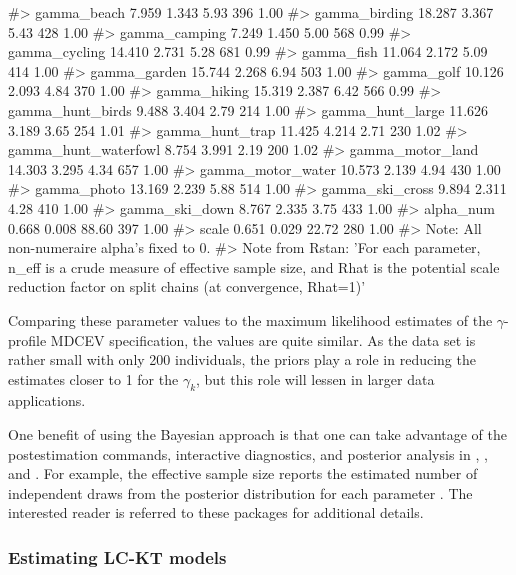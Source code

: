 \begin{Schunk}
\begin{Soutput}
#> gamma_beach             7.959   1.343   5.93   396 1.00
#> gamma_birding          18.287   3.367   5.43   428 1.00
#> gamma_camping           7.249   1.450   5.00   568 0.99
#> gamma_cycling          14.410   2.731   5.28   681 0.99
#> gamma_fish             11.064   2.172   5.09   414 1.00
#> gamma_garden           15.744   2.268   6.94   503 1.00
#> gamma_golf             10.126   2.093   4.84   370 1.00
#> gamma_hiking           15.319   2.387   6.42   566 0.99
#> gamma_hunt_birds        9.488   3.404   2.79   214 1.00
#> gamma_hunt_large       11.626   3.189   3.65   254 1.01
#> gamma_hunt_trap        11.425   4.214   2.71   230 1.02
#> gamma_hunt_waterfowl    8.754   3.991   2.19   200 1.02
#> gamma_motor_land       14.303   3.295   4.34   657 1.00
#> gamma_motor_water      10.573   2.139   4.94   430 1.00
#> gamma_photo            13.169   2.239   5.88   514 1.00
#> gamma_ski_cross         9.894   2.311   4.28   410 1.00
#> gamma_ski_down          8.767   2.335   3.75   433 1.00
#> alpha_num               0.668   0.008  88.60   397 1.00
#> scale                   0.651   0.029  22.72   280 1.00
#> Note: All non-numeraire alpha's fixed to 0. 
#> Note from Rstan: 'For each parameter, n_eff is a crude measure of effective sample size, and Rhat is the potential scale reduction factor on split chains (at convergence, Rhat=1)'
\end{Soutput}
\end{Schunk}

Comparing these parameter values to the maximum likelihood estimates of
the \(\gamma\)-profile MDCEV specification, the values are quite
similar. As the data set is rather small with only 200 individuals, the
priors play a role in reducing the estimates closer to 1 for the
\(\gamma_k\), but this role will lessen in larger data applications.

One benefit of using the Bayesian approach is that one can take
advantage of the postestimation commands, interactive diagnostics, and
posterior analysis in ,
\href{https://mc-stan.org/bayesplot/}{}
\citep{gabrybayesplot2019}, and
\href{http://mc-stan.org/shinystan/}{}
\citep{muthuser2018}. For example, the effective sample size reports the
estimated number of independent draws from the posterior distribution
for each parameter \citep{stan2019}. The interested reader is referred
to these packages for additional details.

\hypertarget{estimating-lc-kt-models}{%
\subsubsection{Estimating LC-KT models}\label{estimating-lc-kt-models}}

